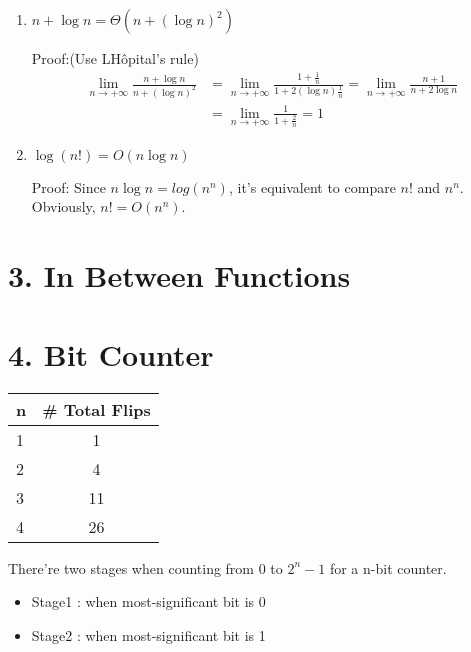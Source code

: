 \documentclass[11pt]{article}
\newenvironment{qparts}{\begin{enumerate}[{(}a{)}]}{\end{enumerate}}
\begin{document}
\begin{qparts}
\begin{enumerate}
 \item $n + \log n = \Theta(n + (\log n)^2)$
 
 Proof:(Use L\textquotesingle Hôpital's rule)
  \begin{align*}
  	\lim_{n \to+\infty} \frac{n + \log n}{n + (\log n)^2}
		&= \lim_{n \to+\infty} \frac{1 + \frac{1}{n}}{1 + 2(\log n)\frac{1}{n}} = \lim_{n \to+\infty}\frac{n +1}{n + 2\log n} \\
		&= \lim_{n \to+\infty} \frac{1}{1 + \frac{2}{n}} = 1
   \end{align*}
   
  \item $\log (n!) = O(n\log n)$
  
  Proof: Since $n\log n = log (n^n)$, it's equivalent to compare $n!$ and $n^n$. Obviously, $n! = O(n^n)$.
 
\end{enumerate}

\end{qparts}

\newpage
\section*{3. In Between Functions}

\newpage
\section*{4. Bit Counter}

\begin{tabular}{l | c}
    n	&   \# Total Flips  \\\hline
    1  &   1  \\  
    2  &   4  \\
    3  &   11 \\
    4  &   26 \\
\end{tabular}

There're two stages when counting from 0 to $2^n-1$ for a n-bit counter. 

\begin{itemize}
	\item Stage1 : when most-significant bit is 0
	\item Stage2 : when most-significant bit is 1
\end{itemize}
\end{document}
